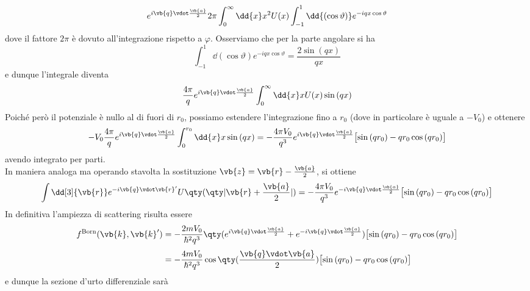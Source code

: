 \begin{soluzione}
   \begin{equation*}
      e^{i \vb{q} \vdot \frac{\vb{a}}{2}} 2\pi \int_{0}^{\infty} \dd{x} x^2 U(x) \int_{-1}^{1} \dd{(\cos{\vartheta})} e^{-i q x \cos{\vartheta}}
   \end{equation*}
   dove il fattore $2\pi$ è dovuto all'integrazione rispetto a $\varphi$. Osserviamo che per la parte angolare si ha
   \begin{equation*}
      \int_{-1}^{1} \dd{(\cos{\vartheta})} e^{-i q x \cos{\vartheta}}
      = \frac{2 \sin{(q x)}}{q x}
   \end{equation*}
   e dunque l'integrale diventa
   \begin{equation*}
      \frac{4\pi}{q} e^{ i \vb{q} \vdot \frac{\vb{a}}{2} } \int_{0}^{\infty} \dd{x} x U(x) \sin{(qx)}
   \end{equation*}
   Poiché però il potenziale è nullo al di fuori di $r_0$, possiamo estendere l'integrazione fino a $r_0$ (dove in particolare è uguale a $-V_0$) e ottenere
   \begin{equation*}
      -V_0 \frac{4\pi}{q} e^{i \vb{q} \vdot \frac{\vb{a}}{2} } \int_{0}^{r_0} \dd{x} x \sin{(qx)}
      =-\frac{4\pi V_0}{q^3} e^{ i \vb{q} \vdot \frac{\vb{a}}{2} } \bigl[ \sin{(qr_0)} - qr_0\cos{(qr_0)} \bigr]
   \end{equation*}
   avendo integrato per parti.\\
   In maniera analoga ma operando stavolta la sostituzione $\vb{z}=\vb{r} - \frac{\vb{a}}{2}$, si ottiene
   \begin{equation*}
      \int \dd[3]{\vb{r}} e^{-i \vb{q} \vdot \vb{r}'} U\qty( \qty| \vb{r} + \frac{\vb{a}}{2} | )
      =-\frac{4\pi V_0}{q^3} e^{ -i \vb{q} \vdot \frac{\vb{a}}{2} } \bigl[ \sin{(qr_0)} - qr_0\cos{(qr_0)} \bigr]
   \end{equation*}
   In definitiva l'ampiezza di scattering risulta essere
   \begin{equation*}
      \begin{split}
         f^{\rm Born}(\vb{k},\vb{k}')
         & =-\frac{2 m V_0}{\hbar^2 q^3} \qty( e^{ i \vb{q} \vdot \frac{\vb{a}}{2} } + e^{ -i \vb{q} \vdot \frac{\vb{a}}{2} } ) \bigl[ \sin{(qr_0)} - qr_0\cos{(qr_0)} \bigr]
         \\[0.1cm]
         & =-\frac{4 m V_0}{\hbar^2 q^3} \cos{ \qty( \frac{\vb{q} \vdot \vb{a}}{2} ) } \bigl[ \sin{(qr_0)} - qr_0\cos{(qr_0)} \bigr]
      \end{split}
   \end{equation*}
   e dunque la sezione d'urto differenziale sarà

\end{soluzione}
